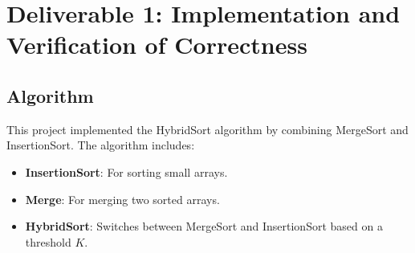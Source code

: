 \documentclass{article}
\begin{document}
\section*{Deliverable 1: Implementation and Verification of Correctness}

\subsection{Algorithm}
This project implemented the HybridSort algorithm by combining MergeSort and InsertionSort. The algorithm includes:
	
\begin{itemize}
    \item \textbf{InsertionSort}: For sorting small arrays.
    \item \textbf{Merge}: For merging two sorted arrays.
    \item \textbf{HybridSort}: Switches between MergeSort and InsertionSort based on a threshold \( K \).
\end{itemize}
	
\end{document}
